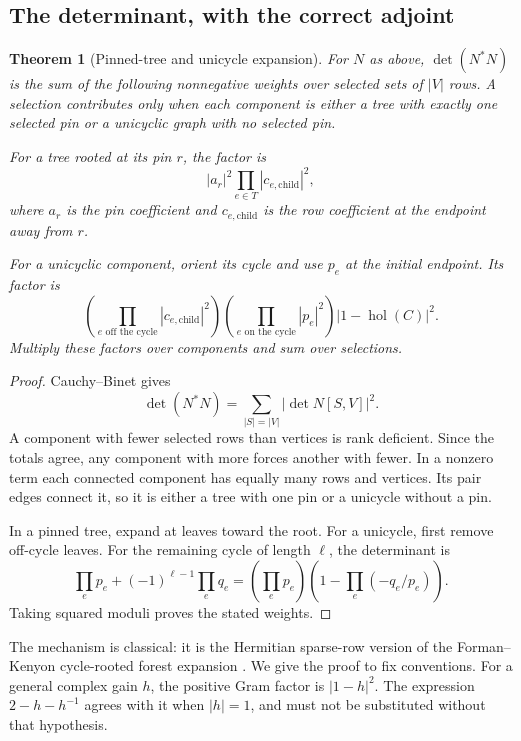 \documentclass[11pt,a4paper,oneside]{report}
\newtheorem{theorem}{Theorem}[section]
\theoremstyle{definition}
\theoremstyle{remark}
\DeclareMathOperator{\hol}{hol}
\begin{document}
\subsection{The determinant, with the correct adjoint}
\begin{theorem}[Pinned-tree and unicycle expansion]\label{M02:thm:forest}
For \(N\) as above, \(\det(N^*N)\) is the sum of the following nonnegative weights over selected sets of \(|V|\) rows. A selection contributes only when each component is either a tree with exactly one selected pin or a unicyclic graph with no selected pin.

For a tree rooted at its pin \(r\), the factor is
\[
|a_r|^2\prod_{e\in T}|c_{e,\mathrm{child}}|^2,
\]
where \(a_r\) is the pin coefficient and \(c_{e,\mathrm{child}}\) is the row coefficient at the endpoint away from \(r\).

For a unicyclic component, orient its cycle and use \(p_e\) at the initial endpoint. Its factor is
\[
\left(\prod_{e\text{ off the cycle}}|c_{e,\mathrm{child}}|^2\right)
\left(\prod_{e\text{ on the cycle}}|p_e|^2\right)
|1-\hol(C)|^2.
\]
Multiply these factors over components and sum over selections.
\end{theorem}
\begin{proof}
Cauchy--Binet gives
\[
\det(N^*N)=\sum_{|S|=|V|}|\det N[S,V]|^2.
\]
A component with fewer selected rows than vertices is rank deficient. Since the totals agree, any component with more forces another with fewer. In a nonzero term each connected component has equally many rows and vertices. Its pair edges connect it, so it is either a tree with one pin or a unicycle without a pin.

In a pinned tree, expand at leaves toward the root. For a unicycle, first remove off-cycle leaves. For the remaining cycle of length \(\ell\), the determinant is
\[
\prod_e p_e+(-1)^{\ell-1}\prod_e q_e
=\left(\prod_e p_e\right)
\left(1-\prod_e(-q_e/p_e)\right).
\]
Taking squared moduli proves the stated weights.
\end{proof}
The mechanism is classical: it is the Hermitian sparse-row version of the Forman--Kenyon cycle-rooted forest expansion \cite{B:Kenyon}. We give the proof to fix conventions. For a general complex gain \(h\), the positive Gram factor is \(|1-h|^2\). The expression \(2-h-h^{-1}\) agrees with it when \(|h|=1\), and must not be substituted without that hypothesis.
\end{document}
